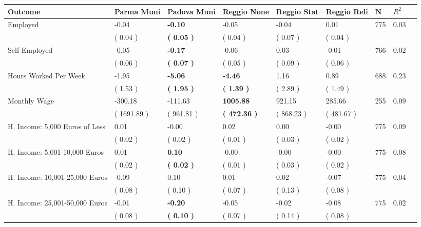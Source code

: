 \begin{tabular}{L{6.2cm} C{1.8cm} C{1.8cm} C{1.8cm} C{1.8cm} C{1.8cm} C{1.8cm} C{0.3cm} C{0.3cm}}
\toprule
 \textbf{Outcome} & \textbf{Parma Muni} & \textbf{Padova Muni} & \textbf{Reggio None} & \textbf{Reggio Stat} & \textbf{Reggio Reli} & \textbf{N} & \textbf{$ R^2$} \\
\midrule
Employed &     -0.04 & \textbf{    -0.10} &     -0.05 &     -0.04 &      0.01  & 775 &       0.03 \\ 
 & (     0.04 ) & \textbf{(     0.05 )} & (     0.04 ) & (     0.07 ) & (     0.04 )  & \\
Self-Employed &     -0.05 & \textbf{    -0.17} &     -0.06 &      0.03 &     -0.01  & 766 &       0.02 \\ 
 & (     0.06 ) & \textbf{(     0.07 )} & (     0.05 ) & (     0.09 ) & (     0.06 )  & \\
Hours Worked Per Week &     -1.95 & \textbf{    -5.06} & \textbf{    -4.46} &      1.16 &      0.89  & 688 &       0.23 \\ 
 & (     1.53 ) & \textbf{(     1.95 )} & \textbf{(     1.39 )} & (     2.89 ) & (     1.49 )  & \\
Monthly Wage &   -300.18 &   -111.63 & \textbf{  1005.88} &    921.15 &    285.66  & 255 &       0.09 \\ 
 & (  1691.89 ) & (   961.81 ) & \textbf{(   472.36 )} & (   868.23 ) & (   481.67 )  & \\
H. Income: 5,000 Euros of Less &      0.01 &     -0.00 &      0.02 &      0.00 &     -0.00  & 775 &       0.09 \\ 
 & (     0.02 ) & (     0.02 ) & (     0.01 ) & (     0.03 ) & (     0.02 )  & \\
H. Income: 5,001-10,000 Euros &      0.01 & \textbf{     0.10} &     -0.00 &     -0.00 &     -0.00  & 775 &       0.08 \\ 
 & (     0.02 ) & \textbf{(     0.02 )} & (     0.01 ) & (     0.03 ) & (     0.02 )  & \\
H. Income: 10,001-25,000 Euros &     -0.09 &      0.10 &      0.01 &      0.02 &     -0.07  & 775 &       0.04 \\ 
 & (     0.08 ) & (     0.10 ) & (     0.07 ) & (     0.13 ) & (     0.08 )  & \\
H. Income: 25,001-50,000 Euros &     -0.01 & \textbf{    -0.20} &     -0.05 &     -0.02 &     -0.08  & 775 &       0.02 \\ 
 & (     0.08 ) & \textbf{(     0.10 )} & (     0.07 ) & (     0.14 ) & (     0.08 )  & \\

\end{tabular}

